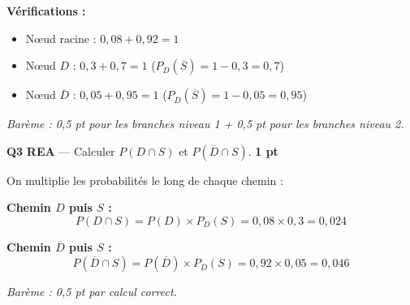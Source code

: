 \documentclass[a4paper,11pt]{article}
\newcommand{\pts}[1]{\hfill\textcolor{gris}{\small\textbf{#1}}}
\newcommand{\comp}[1]{\colorbox{blue!10}{\scriptsize\textbf{#1}}}
\begin{document}
\begin{corrbox}
\begin{center}
\end{center}

\textbf{Vérifications :}
\begin{itemize}[nosep]
  \item Nœud racine : $0{,}08 + 0{,}92 = 1$ \checkmark
  \item Nœud $D$ : $0{,}3 + 0{,}7 = 1$ \checkmark \quad ($P_D(\overline{S}) = 1 - 0{,}3 = 0{,}7$)
  \item Nœud $\overline{D}$ : $0{,}05 + 0{,}95 = 1$ \checkmark \quad ($P_{\overline{D}}(\overline{S}) = 1 - 0{,}05 = 0{,}95$)
\end{itemize}

\textit{Barème : 0,5 pt pour les branches niveau 1 + 0,5 pt pour les branches niveau 2.}
\end{corrbox}

\textbf{Q3} \comp{REA} — Calculer $P(D \cap S)$ et $P(\overline{D} \cap S)$. \pts{1 pt}

\begin{corrbox}
On multiplie les probabilités le long de chaque chemin :

\textbf{Chemin $D$ puis $S$ :}
\[
P(D \cap S) = P(D) \times P_D(S) = 0{,}08 \times 0{,}3 = \boxed{0{,}024}
\]

\textbf{Chemin $\overline{D}$ puis $S$ :}
\[
P(\overline{D} \cap S) = P(\overline{D}) \times P_{\overline{D}}(S) = 0{,}92 \times 0{,}05 = \boxed{0{,}046}
\]

\textit{Barème : 0,5 pt par calcul correct.}
\end{corrbox}
\end{document}
